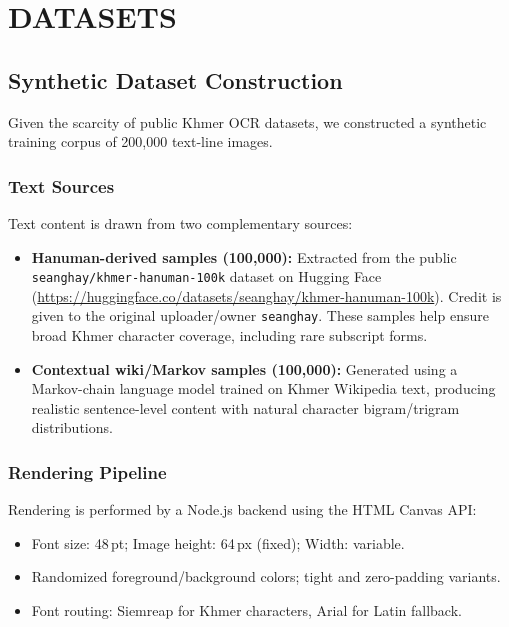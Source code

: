 \documentclass[conference]{IEEEtran}
\begin{document}
\section{DATASETS}

\subsection{Synthetic Dataset Construction}

Given the scarcity of public Khmer OCR datasets, we constructed a synthetic
training corpus of 200,000 text-line images.

\subsubsection{Text Sources}

Text content is drawn from two complementary sources:
\begin{itemize}
  \item \textbf{Hanuman-derived samples (100,000):} Extracted from the public
        \texttt{seanghay/khmer-hanuman-100k} dataset on Hugging Face
        (\url{https://huggingface.co/datasets/seanghay/khmer-hanuman-100k}).
        Credit is given to the original uploader/owner \texttt{seanghay}. These
        samples help ensure broad Khmer character coverage, including rare
        subscript forms.
  \item \textbf{Contextual wiki/Markov samples (100,000):} Generated using a
        Markov-chain language model trained on Khmer Wikipedia text, producing
        realistic sentence-level content with natural character bigram/trigram
        distributions.
\end{itemize}

\subsubsection{Rendering Pipeline}

Rendering is performed by a Node.js backend using the HTML Canvas API:
\begin{itemize}
  \item Font size: 48\,pt; Image height: 64\,px (fixed); Width: variable.
  \item Randomized foreground/background colors; tight and zero-padding variants.
  \item Font routing: Siemreap for Khmer characters, Arial for Latin fallback.
\end{itemize}
\end{document}
